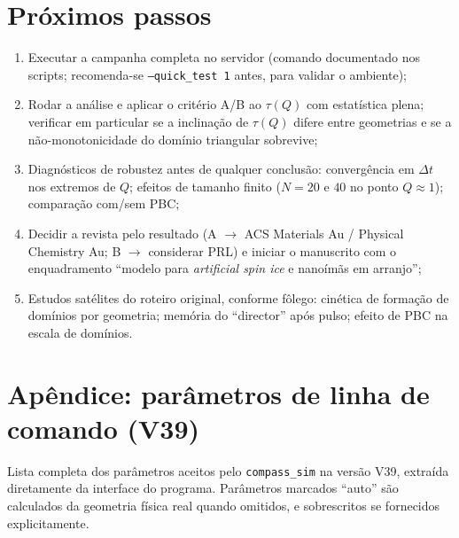 \documentclass[11pt,a4paper]{article}
\newcommand{\code}[1]{\texttt{#1}}
\begin{document}
\section{Próximos passos}

\begin{enumerate}
\item Executar a campanha completa no servidor (comando documentado nos
scripts; recomenda-se \code{--quick\_test 1} antes, para validar o
ambiente);
\item Rodar a análise e aplicar o critério A/B ao $\tau(Q)$ com
estatística plena; verificar em particular se a inclinação de $\tau(Q)$
difere entre geometrias e se a não-monotonicidade do domínio triangular
sobrevive;
\item Diagnósticos de robustez antes de qualquer conclusão: convergência
em $\Delta t$ nos extremos de $Q$; efeitos de tamanho finito ($N = 20$ e
$40$ no ponto $Q \approx 1$); comparação com/sem PBC;
\item Decidir a revista pelo resultado (A $\to$ ACS Materials Au /
Physical Chemistry Au; B $\to$ considerar PRL) e iniciar o manuscrito
com o enquadramento ``modelo para \emph{artificial spin ice} e nanoímãs
em arranjo'';
\item Estudos satélites do roteiro original, conforme fôlego: cinética
de formação de domínios por geometria; memória do ``director'' após
pulso; efeito de PBC na escala de domínios.
\end{enumerate}

\appendix
\section{Apêndice: parâmetros de linha de comando (V39)}

Lista completa dos parâmetros aceitos pelo \code{compass\_sim} na versão
V39, extraída diretamente da interface do programa. Parâmetros marcados
``auto'' são calculados da geometria física real quando omitidos, e
sobrescritos se fornecidos explicitamente.

\begingroup
\small
\setlength{\tabcolsep}{5pt}
\renewcommand{\arraystretch}{1.15}
\end{document}
